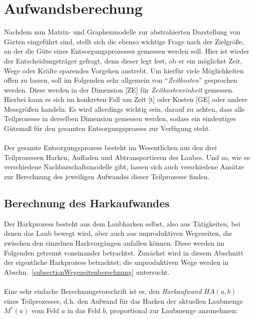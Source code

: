 \documentclass[fontsize=12pt,doubleside,openany,listof=totoc,listof=flat,listof=nochaptergap,numbers=noenddot]{scrbook}
\theoremstyle{style}
\begin{document}
\section{Aufwandsberechung}
\label{sectionAufwandsberechung}

\noindent Nachdem nun Matrix- und Graphenmodelle zur abstrahierten Darstellung von Gärten 
eingeführt sind, stellt sich die ebenso wichtige Frage nach der Zielgröße, an der 
die Güte eines Entsorgungsprozesses gemessen werden soll. Hier ist wieder der 
Entscheidungsträger gefragt, denn dieser legt fest, ob er ein möglichst Zeit, Wege oder Kräfte sparendes Vorgehen anstrebt. Um hierfür viele Möglichkeiten offen zu lassen, soll im Folgenden sehr allgemein von "`\textit{Zeitkosten}"'\label{Zeitkosten} gesprochen werden. Diese werden in der Dimension [ZE] für \textit{Zeitkosteneinheit}\label{Zeitkosteneinheit} gemessen. Hierbei kann es sich im konkreten Fall um Zeit [t] oder Kosten [GE] oder andere Messgrößen handeln. Es wird allerdings wichtig sein, darauf zu achten, dass alle Teilprozesse in derselben Dimension gemessen werden, sodass ein eindeutiges Gütemaß für den gesamten Entsorgungsprozess zur Verfügung steht.
\\ \\
Der gesamte Entsorgungsprozess besteht im Wesentlichen aus den drei 
Teilprozessen Harken, Aufladen und Abtransportieren des Laubes. Und so, wie 
es verschiedene Nachbarschaftsmodelle gibt, lassen sich auch verschiedene 
Ansätze zur Berechnung des jeweiligen Aufwandes dieser Teilprozesse finden. 

\subsection{Berechnung des Harkaufwandes}
\label{subsectionHarkaufwandsberechnung}

Der Harkprozess besteht aus dem Laubharken selbst, also aus Tätigkeiten, bei denen das Laub bewegt wird, aber auch aus unproduktiven Wegezeiten, die zwischen den einzelnen Harkvorgängen anfallen können. Diese werden im Folgenden getrennt voneinander betrachtet. Zunächst wird in diesem Abschnitt der eigentliche Harkprozess betrachtet; die unproduktiven Wege werden in Abschn.~\ref{subsectionWegezeitenberechnung} untersucht.\\
\\
Eine sehr einfache Berechnungsvorschrift ist es, den \textit{Harkaufwand}\label{Harkaufwand}
$HA(a,b)$ eines Teilprozesses, d.h. den Aufwand für das Harken der aktuellen Laubmenge $M^*(a)$ vom Feld $a$ in das Feld $b$, proportional zur Laubmenge anzunehmen: \label{Kru_Seite_Harkaufwandsmodell}
\end{document}
